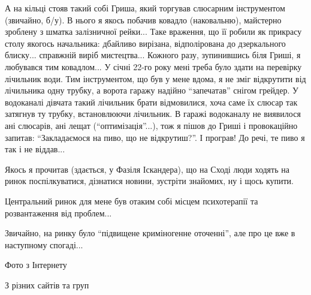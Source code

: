 А на кільці стояв такий собі Гриша, який торгував слюсарним інструментом
(звичайно, б/у). В нього я якось побачив ковадло (наковальню), майстерно
зроблену з шматка залізничної рейки... Таке враження, що її робили як прикрасу
столу якогось начальника: дбайливо вирізана, відполірована до дзеркального
блиску... справжній виріб мистецтва... Кожного разу, зупинившись біля Гриші, я
любувався тим ковадлом... У січні 22-го року мені треба було здати на перевірку
лічильник води. Тим інструментом, що був у мене вдома, я не зміг відкрутити від
лічильника одну трубку, а ворота гаражу надійно \enquote{запечатав} снігом грейдер. У
водоканалі дівчата такий лічильник брати відмовилися, хоча саме їх слюсар так
затягнув ту трубку, встановлюючи лічильник. В гаражі водоканалу не виявилося
ані слюсарів, ані лещат (\enquote{оптимізація}...), тож я пішов до Гриші і провокаційно
запитав: \enquote{Закладаємося на пиво, що не відкрутиш?}. І програв! До речі, те пиво
я так і не віддав...

Якось я прочитав (здається, у Фазіля Іскандера), що на Сході люди ходять на
ринок поспілкуватися, дізнатися новини, зустріти знайомих, ну і щось купити.

Центральний ринок для мене був отаким собі місцем психотерапії та розвантаження
від проблем...

Звичайно, на ринку було \enquote{підвищене криміногенне оточенні}, але про це вже в
наступному спогаді... 

Фото з Інтернету

З різних сайтів та груп

